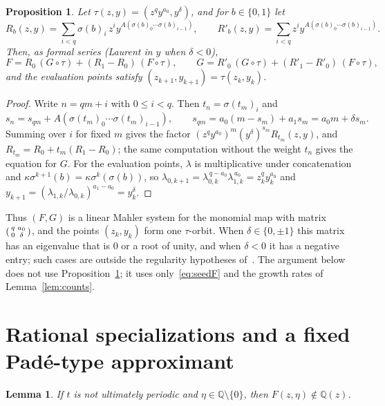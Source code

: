 \documentclass[11pt]{amsart}
\newtheorem{lemma}[theorem]{Lemma}
\newtheorem{proposition}[theorem]{Proposition}
\theoremstyle{remark}
\theoremstyle{definition}
\numberwithin{equation}{section}
\newcommand{\Q}{\mathbb{Q}}
\begin{document}
\begin{proposition}\label{prop:mahler}
Let $\tau(z,y)=(z^qy^{a_0},y^{\delta})$, and for $b\in\{0,1\}$ let
\[
R_b(z,y)=\sum_{i<q}\sigma(b)_i\,z^iy^{A(\sigma(b)_0\cdots\sigma(b)_{i-1})},\qquad R'_b(z,y)=\sum_{i<q}z^iy^{A(\sigma(b)_0\cdots\sigma(b)_{i-1})}.
\]
Then, as formal series (Laurent in $y$ when $\delta<0$),
\[
F=R_0\,(G\circ\tau)+(R_1-R_0)\,(F\circ\tau),\qquad G=R'_0\,(G\circ\tau)+(R'_1-R'_0)\,(F\circ\tau),
\]
and the evaluation points satisfy $(z_{k+1},y_{k+1})=\tau(z_k,y_k)$.
\end{proposition}

\begin{proof}
Write $n=qm+i$ with $0\le i<q$. Then $t_n=\sigma(t_m)_i$ and
\[s_n=s_{qm}+A(\sigma(t_m)_0\cdots\sigma(t_m)_{i-1}),\qquad s_{qm}=a_0(m-s_m)+a_1s_m=a_0m+\delta s_m.\]
 Summing over $i$ for fixed $m$ gives the factor $(z^qy^{a_0})^m(y^\delta)^{s_m}R_{t_m}(z,y)$, and $R_{t_m}=R_0+t_m(R_1-R_0)$; the same computation without the weight $t_n$ gives the equation for $G$. For the evaluation points, $\lambda$ is multiplicative under concatenation and $\kappa\sigma^{k+1}(b)=\kappa\sigma^k(\sigma(b))$, so $\lambda_{0,k+1}=\lambda_{0,k}^{\,q-a_0}\lambda_{1,k}^{\,a_0}=z_k^qy_k^{a_0}$ and $y_{k+1}=(\lambda_{1,k}/\lambda_{0,k})^{a_1-a_0}=y_k^\delta$.
\end{proof}

Thus $(F,G)$ is a linear Mahler system for the monomial map with matrix $\begin{psmallmatrix} q&a_0\\0&\delta\end{psmallmatrix}$, and the points $(z_k,y_k)$ form one $\tau$-orbit. When $\delta\in\{0,\pm1\}$ this matrix has an eigenvalue that is $0$ or a root of unity, and when $\delta<0$ it has a negative entry; such cases are outside the regularity hypotheses of~\cite{LvdP1982}. The argument below does not use Proposition~\ref{prop:mahler}; it uses only~\eqref{eq:seedF} and the growth rates of Lemma~\ref{lem:counts}.

\section{Rational specializations and a fixed Pad\'e-type approximant}\label{sec:pade}

\begin{lemma}\label{lem:NS}
If $t$ is not ultimately periodic and $\eta\in\Q\setminus\{0\}$, then $F(z,\eta)\notin\Q(z)$.
\end{lemma}
\end{document}
